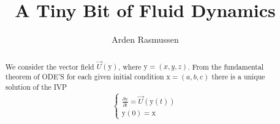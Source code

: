 \documentclass[10pt]{article}
\title{A Tiny Bit of Fluid Dynamics}
\author{Arden Rasmussen}
\begin{document}
\maketitle
\begin{abstract}
  We consider the vector field $\vec{U}\left(\mathrm{y}\right)$, where
  $\mathrm{y}=\left(x,y,z\right)$. From the fundamental theorem of ODE'S for each given
  initial condition $\mathrm{x}=\left(a,b,c\right)$ there is a unique solution of the
  IVP
  \begin{align*}
    \left\{ \begin{array}{l}
        \frac{\partial \mathrm{y}}{\partial t}=\vec{U}\left(\mathrm{y}\left(t\right)\right)\\
        \mathrm{y}\left(0\right)=\mathrm{x}
    \end{array} \right.
  \end{align*}
\end{abstract}
\end{document}
